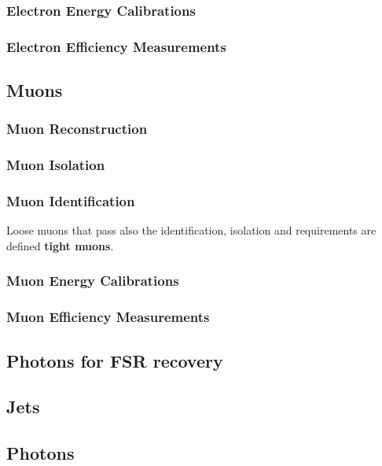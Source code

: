 \subsubsection{Electron Energy Calibrations}

\subsubsection{Electron Efficiency Measurements}
\label{sec:eleEffMeas}


\subsection{Muons}
\subsubsection{Muon Reconstruction}
\label{sec:muonReco}

\subsubsection{Muon Isolation}
\label{sec:muoniso}

\subsubsection{Muon Identification}
\label{sec:muonID}


Loose muons that pass also the identification, isolation and \SIPthreeD requirements are defined \textbf{tight muons}.

\subsubsection{Muon Energy Calibrations}

\subsubsection{Muon Efficiency Measurements}
\label{sec:muonEffMeas}

%
\subsection{Photons for FSR recovery}
\label{sec:FSRphotons}

\subsection{Jets}
\label{sec:jets}


\subsection{Photons}
\label{sec:photons}

